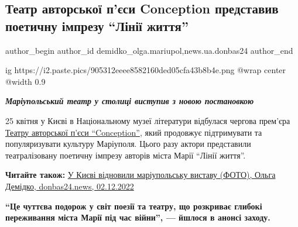  
 
 
 
 
 
\subsection{Театр авторської п'єси Conception представив поетичну імпрезу \enquote{Лінії життя}}
\label{sec:26_04_2023.stz.news.ua.donbas24.1.teatr_conception_linii_zhyttja}
 
\ifcmt
 author_begin
   author_id demidko_olga.mariupol,news.ua.donbas24
 author_end
\fi

\ifcmt
  ig https://i2.paste.pics/905312eeee8582160ded05cfa43b8b4e.png
  @wrap center
  @width 0.9
\fi

\begin{center}
  \em\color{blue}\bfseries\Large
  Маріупольський театр у столиці виступив з новою постановкою
\end{center}

25 квітня у Києві в Національному музеї літератури відбулася чергова прем'єра
\href{https://donbas24.news/news/mariupolskii-teatr-conception-pokazav-u-ternopoli-svoyu-vistavu}{Театру
авторської п'єси \enquote{Conception}}, який продовжує підтримувати та
популяризувати культуру Маріуполя. Цього разу актори представили театралізовану
поетичну імпрезу авторів міста Марії \enquote{Лінії життя}.

\textbf{Читайте також:} \href{https://donbas24.news/news/u-kijevi-vidnovili-mariupolsku-vistavu}{%
У Києві відновили маріупольську виставу (ФОТО), Ольга Демідко, donbas24.news, 02.12.2022}

\begin{leftbar}
	\begingroup
		\bfseries
\enquote{Це чуттєва подорож у світ поезії та театру, що розкриває глибокі переживання міста Марії під час війни}, — йшлося в анонсі заходу. 
	\endgroup
\end{leftbar}

